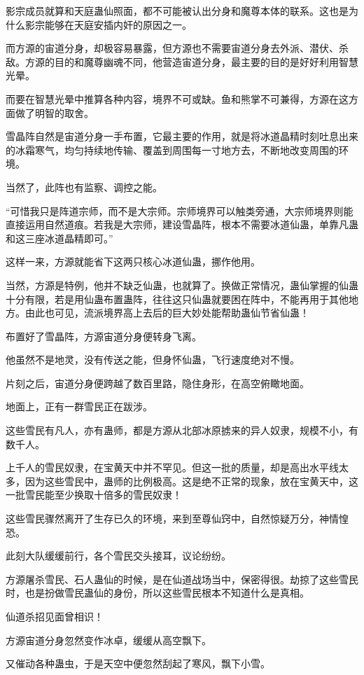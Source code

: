 \begin{this_body}
影宗成员就算和天庭蛊仙照面，都不可能被认出分身和魔尊本体的联系。这也是为什么影宗能够在天庭安插内奸的原因之一。

而方源的宙道分身，却极容易暴露，但方源也不需要宙道分身去外派、潜伏、杀敌。方源的目的和魔尊幽魂不同，他营造宙道分身，最主要的目的是好好利用智慧光晕。

而要在智慧光晕中推算各种内容，境界不可或缺。鱼和熊掌不可兼得，方源在这方面做了明智的取舍。

雪晶阵自然是宙道分身一手布置，它最主要的作用，就是将冰道晶精时刻吐息出来的冰霜寒气，均匀持续地传输、覆盖到周围每一寸地方去，不断地改变周围的环境。

当然了，此阵也有监察、调控之能。

“可惜我只是阵道宗师，而不是大宗师。宗师境界可以触类旁通，大宗师境界则能直接运用自然道痕。若我是大宗师，建设雪晶阵，根本不需要冰道仙蛊，单靠凡蛊和这三座冰道晶精即可。”

这样一来，方源就能省下这两只核心冰道仙蛊，挪作他用。

当然，方源是特例，他并不缺乏仙蛊，也就算了。换做正常情况，蛊仙掌握的仙蛊十分有限，若是用仙蛊布置蛊阵，往往这只仙蛊就要困在阵中，不能再用于其他地方。由此也可见，流派境界高上去后的巨大妙处能帮助蛊仙节省仙蛊！

布置好了雪晶阵，方源宙道分身便转身飞离。

他虽然不是地灵，没有传送之能，但身怀仙蛊，飞行速度绝对不慢。

片刻之后，宙道分身便跨越了数百里路，隐住身形，在高空俯瞰地面。

地面上，正有一群雪民正在跋涉。

这些雪民有凡人，亦有蛊师，都是方源从北部冰原掳来的异人奴隶，规模不小，有数千人。

上千人的雪民奴隶，在宝黄天中并不罕见。但这一批的质量，却是高出水平线太多，因为这些雪民中，蛊师的比例极高。这是绝不正常的现象，放在宝黄天中，这一批雪民能至少换取十倍多的雪民奴隶！

这些雪民骤然离开了生存已久的环境，来到至尊仙窍中，自然惊疑万分，神情惶恐。

此刻大队缓缓前行，各个雪民交头接耳，议论纷纷。

方源屠杀雪民、石人蛊仙的时候，是在仙道战场当中，保密得很。劫掠了这些雪民时，也是扮做雪民蛊仙的身份，所以这些雪民根本不知道什么是真相。

仙道杀招见面曾相识！

方源宙道分身忽然变作冰卓，缓缓从高空飘下。

又催动各种蛊虫，于是天空中便忽然刮起了寒风，飘下小雪。


\end{this_body}
